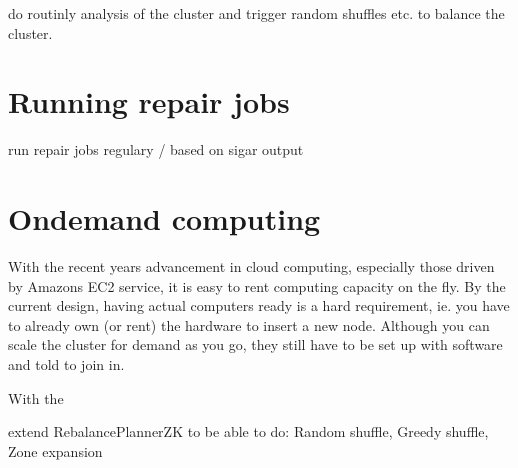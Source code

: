 do routinly analysis of the cluster and trigger random shuffles etc. to balance the cluster.

\section{Running repair jobs}
run repair jobs regulary / based on sigar output


\section{Ondemand computing}
With the recent years advancement in cloud computing, especially those driven by Amazons EC2 service, it is easy to rent computing capacity on the fly. By the current design, having actual computers ready is a hard requirement, ie. you have to already own (or rent) the hardware to insert a new node. Although you can scale the cluster for demand as you go, they still have to be set up with software and told to join in.

With the 

extend RebalancePlannerZK to be able to do: Random shuffle, Greedy shuffle, Zone expansion
